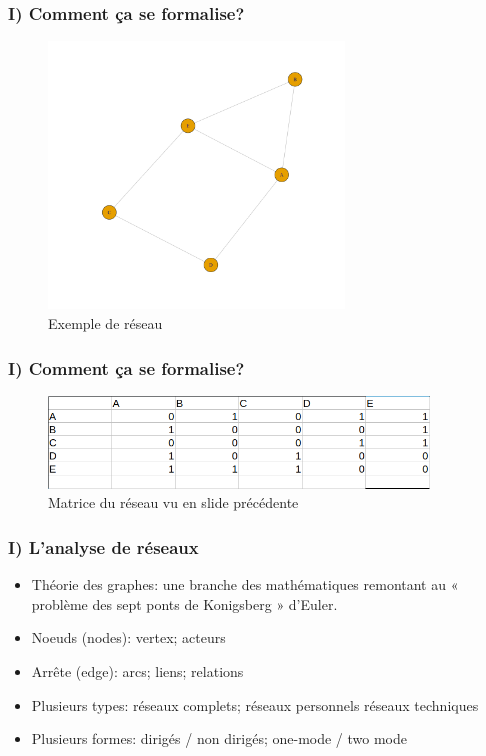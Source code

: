 \documentclass{beamer}
\begin{document}
\begin{frame}
    \frametitle{I) Comment ça se formalise?}
    \begin{figure}
        \centering
        \includegraphics[width = 0.7\textwidth]{network_exemple.png}
        \caption{\small{Exemple de réseau}}
    \end{figure}
\end{frame}

\begin{frame}
    \frametitle{I) Comment ça se formalise?}
    \begin{figure}
        \centering
        \includegraphics[width = 0.9\textwidth]{network_exemple_matrix.png}
        \caption{\small{Matrice du réseau vu en slide précédente}}
      \end{figure}
\end{frame}

\begin{frame}
    \frametitle{I) L'analyse de réseaux}
    \begin{itemize}
        \item Théorie des graphes: une branche des mathématiques remontant au « problème des sept ponts de Konigsberg » d’Euler.
        \item Noeuds (nodes): vertex; acteurs
        \item Arrête (edge): arcs; liens; relations
        \item Plusieurs types: réseaux complets; réseaux personnels réseaux techniques 
        \item  Plusieurs formes: dirigés / non dirigés; one-mode / two mode
    \end{itemize}
\end{frame}
\end{document}
